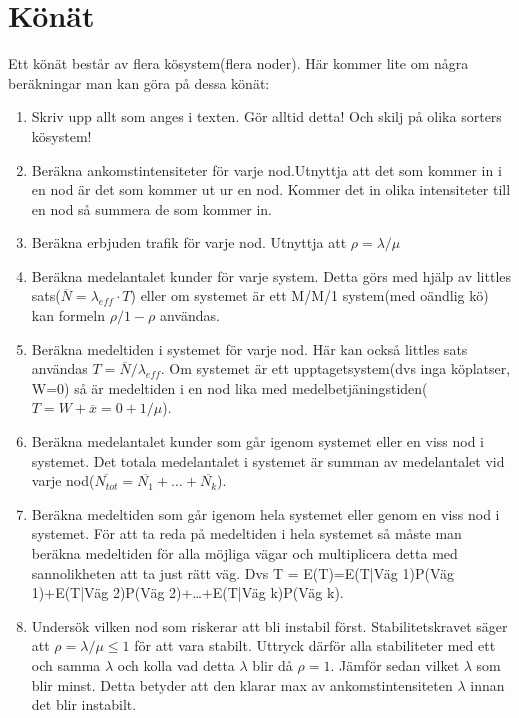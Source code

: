 \documentclass{article}
\begin{document}
\section*{Könät}
Ett könät består av flera kösystem(flera noder). Här kommer lite om några beräkningar man kan göra på dessa könät:
\begin{enumerate}
  \item Skriv upp allt som anges i texten. Gör alltid detta! Och skilj på olika sorters kösystem!
  \item Beräkna ankomstintensiteter för varje nod.Utnyttja att det som kommer in i en nod är det som kommer ut ur en nod. Kommer det in olika intensiteter till en nod så summera de som kommer in.
  \item Beräkna erbjuden trafik för varje nod. Utnyttja att $\rho=\lambda/\mu$ 
  \item Beräkna medelantalet kunder för varje system. Detta görs med hjälp av littles sats($\overline{N} = \lambda_{eff}\cdot T$) eller om systemet är ett M/M/1 system(med oändlig kö) kan formeln $\rho/1-\rho$ användas.
  \item Beräkna medeltiden i systemet för varje nod. Här kan också littles sats användas $T =\overline{N}/\lambda_{eff}$. Om systemet är ett upptagetsystem(dvs inga köplatser, W=0) så är medeltiden i en nod lika med medelbetjäningstiden($T = W + \overline{x} = 0 + 1/\mu$).
  \item Beräkna medelantalet kunder som går igenom systemet eller en viss nod i systemet. Det totala medelantalet i systemet är summan av medelantalet vid varje nod($\overline{N_{tot}} = \overline{N_1} + \ldots + \overline{N_k} $).
  \item Beräkna medeltiden som går igenom hela systemet eller genom en viss nod i systemet. För att ta reda på medeltiden i hela systemet så måste man beräkna medeltiden för alla möjliga vägar och multiplicera detta med sannolikheten att ta just rätt väg. Dvs T = E(T)=E(T|Väg 1)P(Väg 1)+E(T|Väg 2)P(Väg 2)+\ldots+E(T|Väg k)P(Väg k).
  \item Undersök vilken nod som riskerar att bli instabil först. Stabilitetskravet säger att $\rho=\lambda/\mu\leq1$ för att vara stabilt. Uttryck därför alla stabiliteter med ett och samma $\lambda$ och kolla vad detta $\lambda$ blir då $\rho=1$. Jämför sedan vilket $\lambda$ som blir minst. Detta betyder att den klarar max av ankomstintensiteten $\lambda$ innan det blir instabilt.
\end{enumerate}
 	
\end{document}
